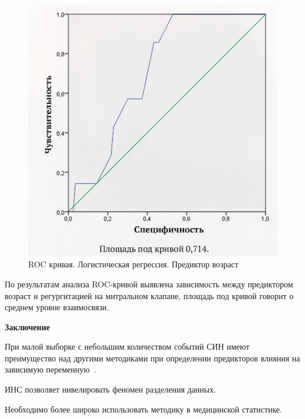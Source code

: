 \documentclass[a4paper,twoside]{article}
\newcommand{\header}[1]{\bigskip\medskip\noindent\textbf{#1}\nopagebreak\bigskip}
\theoremstyle{theorem}
\theoremstyle{remark}
\begin{document}
\begin{figure}[!hb]
	\centering
	\includegraphics[width=0.5\linewidth]{fig1}
	\caption{ROC кривая. Логистическая регрессия. Предиктор возраст}
	\label{fig:roc}
\end{figure}

По результатам анализа ROC-кривой выявлена зависимость между предиктором возраст и регургитацией на митральном клапане, площадь под кривой говорит о среднем уровне взаимосвязи.

\begin{figure}[!ht]
\end{figure}

\header{Заключение}

При малой выборке с небольшим количеством событий СИН имеют преимущество над другими методиками при определении предикторов влияния на зависимую переменную~\cite{Nosovski}.

ИНС позволяет нивелировать феномен разделения данных.

Необходимо более широко использовать методику в медицинской статистике.


\bigskip\bigskip{}



\end{document}
